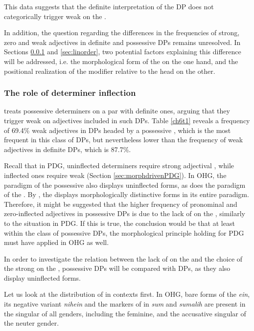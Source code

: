 \documentclass[output=paper,colorlinks,citecolor=brown]{langscibook}
\begin{document}
This data suggests that the definite interpretation of the DP does not
categorically trigger weak  on the .

In addition, the question regarding the differences in the frequencies
of strong, zero and weak adjectives in definite and possessive DPs
remains unresolved. In Sections \ref{sec:detinfl} and \ref{sec:linorder}, two potential factors
explaining this difference will be addressed, i.e. the morphological
form of the  on the one hand, and the positional realization of
the modifier relative to the head  on the other.

\subsubsection{The role of determiner inflection}\label{sec:detinfl}
\citet{Demske01} treats possessive determiners on a par with definite ones,
arguing that they trigger weak  on adjectives included
in such DPs. Table \ref{ch6t1} reveals a frequency of 69.4\% weak adjectives in DPs
headed by a possessive , which is the most frequent  in
this class of DPs, but nevertheless lower than the frequency of weak
adjectives in definite DPs, which is 87.7\%.

Recall that in PDG, uninflected determiners require strong adjectival
, while inflected ones require weak  (Section \ref{sec:morphdrivenPDG}). In
OHG, the paradigm of the possessive  also displays uninflected
forms, as does the paradigm of the  . By ,
the  displays morphologically distinctive forms in
its entire paradigm. Therefore, it might be suggested that the higher
frequency of pronominal and zero-inflected adjectives in possessive DPs is
due to the lack of  on the , similarly to the
situation in PDG. If this is true, the conclusion would be that at least
within the class of possessive DPs, the morphological principle holding
for PDG must have applied in OHG as well.

In order to investigate the relation between the lack of  on
the  and the choice of the strong  on the ,
possessive DPs will be compared with  DPs, as they also
display uninflected  forms.

Let us look at the distribution of  in 
contexts first. In OHG, bare forms of the  
\emph{ein}, its negative variant \emph{nihein} and the markers of
in \emph{sum} and \emph{sumalih} are present in the
 singular of all genders, including the feminine, and the
accusative singular of the neuter gender.
\end{document}
